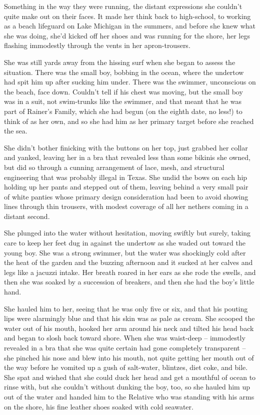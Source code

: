 Something in the way they were running, the distant expressions she 
couldn't quite make out on their faces. It made her think back to 
high-school, to working as a beach lifeguard on Lake Michigan in the 
summers, and before she knew what she was doing, she'd kicked off her 
shoes and was running for the shore, her legs flashing immodestly 
through the vents in her apron-trousers.

She was still yards away from the hissing surf when she began to assess 
the situation. There was the small boy, bobbing in the ocean, where the 
undertow had spit him up after sucking him under. There was the 
swimmer, unconscious on the beach, face down. Couldn't tell if his 
chest was moving, but the small boy was in a suit, not swim-trunks like 
the swimmer, and that meant that he was part of Rainer's Family, which 
she had begun (on the eighth date, no less!) to think of as her own, 
and so she had him as her primary target before she reached the sea.

She didn't bother finicking with the buttons on her top, just grabbed 
her collar and yanked, leaving her in a bra that revealed less than 
some bikinis she owned, but did so through a cunning arrangement of 
lace, mesh, and structural engineering that was probably illegal in 
Texas. She undid the bows on each hip holding up her pants and stepped 
out of them, leaving behind a very small pair of white panties whose 
primary design consideration had been to avoid showing lines through 
thin trousers, with modest coverage of all her nethers coming in a 
distant second.

She plunged into the water without hesitation, moving swiftly but 
surely, taking care to keep her feet dug in against the undertow as she 
waded out toward the young boy. She was a strong swimmer, but the water 
was shockingly cold after the heat of the garden and the buzzing 
afternoon and it sucked at her calves and legs like a jacuzzi intake. 
Her breath roared in her ears as she rode the swells, and then she was 
soaked by a succession of breakers, and then she had the boy's little 
hand.

She hauled him to her, seeing that he was only five or six, and that 
his pouting lips were alarmingly blue and that his skin was as pale as 
cream. She scooped the water out of his mouth, hooked her arm around 
his neck and tilted his head back and began to slosh back toward shore. 
When she was waist-deep -- immodestly revealed in a bra that she was 
quite certain had gone completely transparent -- she pinched his nose 
and blew into his mouth, not quite getting her mouth out of the way 
before he vomited up a gush of salt-water, blintzes, diet coke, and 
bile. She spat and wished that she could duck her head and get a 
mouthful of ocean to rinse with, but she couldn't without dunking the 
boy, too, so she hauled him up out of the water and handed him to the 
Relative who was standing with his arms on the shore, his fine leather 
shoes soaked with cold seawater.

